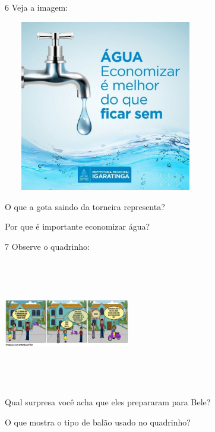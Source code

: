 \num{6} Veja a imagem:

\includegraphics[width=3.52778in,height=2.95347in]{media/image133.jpeg}


\begin{escolha}
\item O que a gota saindo da torneira representa?


\item Por que é importante economizar água?

\end{escolha}

\num{7} Observe o quadrinho:

\includegraphics[width=2.17917in,height=2.18750in]{media/image129.png}

\begin{escolha}
\item Qual surpresa você acha que eles prepararam para Bele?


\item O que mostra o tipo de balão usado no quadrinho?

\end{escolha}

